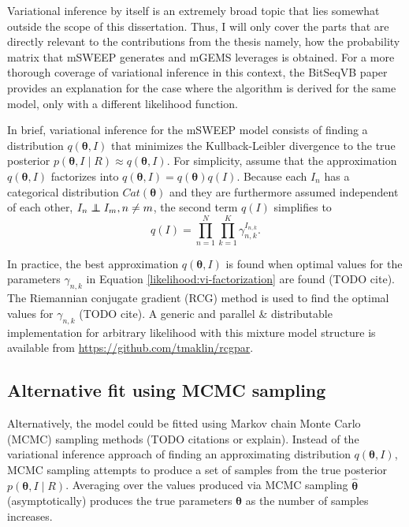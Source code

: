\documentclass[officiallayout]{tktla}
\newcommand\indept{\protect\mathpalette{\protect\independenT}{\perp}}
\def\independenT#1#2{\mathrel{\rlap{$#1#2$}\mkern2mu{#1#2}}}
\begin{document}
Variational inference by itself is an extremely broad topic that lies
somewhat outside the scope of this dissertation. Thus, I will only
cover the parts that are directly relevant to the contributions from
the thesis \textemdash namely, how the probability matrix that mSWEEP
generates and mGEMS leverages is obtained. For a more thorough
coverage of variational inference in this context, the BitSeqVB paper
\citep{hensman2015fast} provides an explanation for the case where the
algorithm is derived for the same model, only with a different
likelihood function.

In brief, variational inference for the mSWEEP model consists of
finding a distribution $q\left(\boldsymbol\theta, I\right)$ that
minimizes the Kullback-Leibler divergence to the true posterior
$p\left(\boldsymbol\theta, I \middle| R\right) \approx
q\left(\boldsymbol\theta, I\right)$. For simplicity, assume that the
approximation $q\left(\boldsymbol\theta, I\right)$ factorizes into
$q\left(\boldsymbol\theta, I\right) =
q\left(\boldsymbol\theta\right)q\left(I\right)$. Because each $I_{n}$
has a categorical distribution $Cat\left(\boldsymbol\theta\right)$ and
they are furthermore assumed independent of each other, $I_{n} \indept
I_{m}, n \neq m$, the second term $q\left(I\right)$ simplifies to
\begin{equation}
  \label{likelihood:vi-factorization}
  q\left(I\right) = \prod_{n = 1}^N\prod_{k = 1}^K \gamma_{n, k}^{I_{n, k}}.
\end{equation}

In practice, the best approximation $q\left(\boldsymbol\theta,
I\right)$ is found when optimal values for the parameters $\gamma_{n,
  k}$ in Equation \ref{likelihood:vi-factorization} are found (TODO
cite). The Riemannian conjugate gradient (RCG) method is used to find the
optimal values for $\gamma_{n, k}$ (TODO cite). A generic and parallel
\& distributable implementation for arbitrary likelihood with this
mixture model structure is available from
\url{https://github.com/tmaklin/rcgpar}.

\subsection{Alternative fit using MCMC sampling}
Alternatively, the model could be fitted using Markov chain Monte
Carlo (MCMC) sampling methods (TODO citations or explain). Instead of
the variational inference approach of finding an approximating
distribution $q\left(\boldsymbol\theta, I\right)$, MCMC sampling
attempts to produce a set of samples from the true posterior
$p\left(\boldsymbol\theta, I\middle| R\right)$. Averaging over the
values produced via MCMC sampling $\hat{\boldsymbol\theta}$
(asymptotically) produces the true parameters $\boldsymbol\theta$ as
the number of samples increases.
\end{document}
